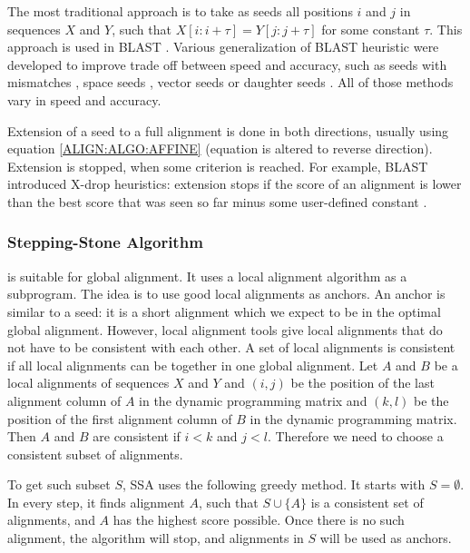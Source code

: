 The most traditional approach is to take as seeds all positions $i$ and $j$ in
sequences $X$ and $Y$, such that $X[i:i+\tau]=Y[j:j+\tau]$ for some constant
$\tau$. This approach is used in BLAST \cite{Altschul1990}.  Various
generalization of BLAST heuristic were developed to improve trade off between
speed and accuracy, such as seeds with mismatches \cite{Kent2002}, space seeds
\cite{Ma2002}, vector seeds \cite{Brejova2005vector} or daughter seeds
\cite{Csuros2005}. All of those methods vary in speed and accuracy.

Extension of a seed to a full alignment is done in both directions, usually
using equation \ref{ALIGN:ALGO:AFFINE} (equation is altered to reverse
direction). Extension is stopped, when some criterion is reached. For example,
BLAST introduced X-drop heuristics: extension stops if the score of an alignment
is lower than the best score that was seen so far minus some user-defined
constant \cite{Altschul1997}.

\subsubsection{Stepping-Stone Algorithm}
\label{SECTION:SSA}

\cite{Meyer2002,Pairagon2009} is suitable for global alignment. It uses
a local alignment algorithm as a subprogram. The idea is to use good local
alignments as anchors. An anchor is similar to a seed: it is a short alignment which we
expect to be in the optimal global alignment.  However, local alignment tools
give local alignments that do not have to be consistent with each other. A set of
local alignments is consistent if all local alignments can be together in one
global alignment. Let $A$ and $B$ be a local alignments of sequences $X$ and
$Y$ and $(i,j)$ be the position of the last alignment column of $A$ in the dynamic
programming matrix and $(k,l)$ be the position of the first alignment column of
$B$ in the dynamic programming matrix. Then $A$ and $B$ are consistent if $i<k$
and $j<l$.
Therefore we need to choose a consistent subset of alignments.

To get such subset $S$, SSA uses the following greedy method. It starts with
$S=\emptyset$. In every step, it finds alignment $A$, such that $S\cup\{A\}$ is
a consistent set of alignments, and $A$ has the highest score possible. Once there is no
such alignment, the algorithm will stop, and alignments in  $S$
will be used as anchors.


